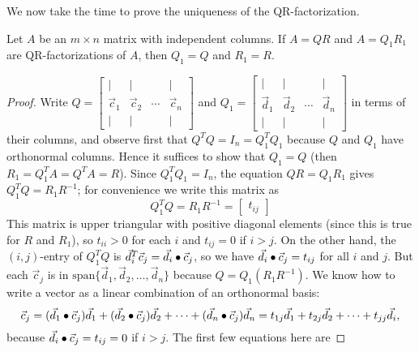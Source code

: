 \documentclass{ximera}
\begin{document}
We now take the time to prove the uniqueness of the QR-factorization.
    
\begin{theorem}\label{th:QR-unique-025187}
Let $A$ be an $m \times n$ matrix with independent columns. If $A = QR$ and $A = Q_{1}R_{1}$ are QR-factorizations of $A$, then $Q_{1} = Q$ and $R_{1} = R$.
\end{theorem}
    
\begin{proof}
Write $Q = \left[ \begin{array}{cccc}
|&|& &| \\
\vec{c}_{1} & \vec{c}_{2} & \cdots &  \vec{c}_{n}\\
|&|& &|
\end{array}\right]$  and $Q_{1} =  \left[ \begin{array}{cccc}
|&|& &| \\
\vec{d}_{1} & \vec{d}_{2} & \cdots &  \vec{d}_{n}\\
|&|& &|
\end{array}\right]$ in terms of their columns, and observe first that $Q^TQ = I_{n} = Q_{1}^TQ_{1}$ because $Q$ and $Q_{1}$ have orthonormal columns. Hence it suffices to show that $Q_{1} = Q$ (then $R_{1} = Q_{1}^TA = Q^TA = R$). Since $Q_{1}^TQ_{1} = I_{n}$, the equation $QR = Q_{1}R_{1}$ gives $Q_{1}^TQ = R_{1}R^{-1}$; for convenience we write this matrix as
\begin{equation*}
Q_{1}^TQ = R_{1}R^{-1} = \left[ \begin{array}{c} t_{ij} \end{array}\right]
\end{equation*}
This matrix is upper triangular with positive diagonal elements (since this is true for $R$ and $R_{1}$), so $t_{ii} > 0$ for each $i$ and $t_{ij} = 0$ if $i > j$. On the other hand, the $(i, j)$-entry of $Q_{1}^TQ$ is $\vec{d}_{i}^T\vec{c}_{j} = \vec{d}_{i} \bullet \vec{c}_{j}$, so we have $\vec{d}_{i} \bullet \vec{c}_{j} = t_{ij}$ for all $i$ and $j$. But each $\vec{c}_{j}$ is in $\mbox{span}\{\vec{d}_{1}, \vec{d}_{2}, \dots, \vec{d}_{n}\}$ because $Q = Q_{1}(R_{1}R^{-1})$. We know how to write a vector as a linear combination of an orthonormal basis:
\begin{equation*}
\vec{c}_{j} = (\vec{d}_{1} \bullet \vec{c}_{j})\vec{d}_{1} + (\vec{d}_{2} \bullet \vec{c}_{j})\vec{d}_{2} + \dots + (\vec{d}_{n} \bullet \vec{c}_{j})\vec{d}_{n} = t_{1j}\vec{d}_{1} + t_{2j}\vec{d}_{2} + \dots + t_{jj}\vec{d}_{i},
\end{equation*}
because $\vec{d}_{i} \bullet \vec{c}_{j} = t_{ij} = 0$ if $i > j$. The first few equations here are

\end{proof}
\end{document}
